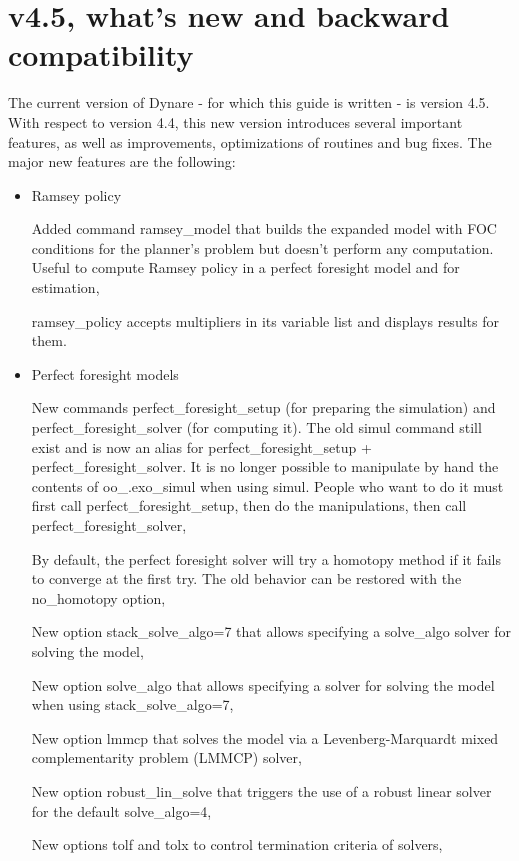 \documentclass[cn,10pt,math=newtx,citestyle=gb7714-2015,bibstyle=gb7714-2015]{elegantbook}
\begin{document}
	\section{v4.5, what's new and backward compatibility}
	The current version of Dynare - for which this guide is written - is version 4.5. With respect to version 4.4, this new version introduces several important features, as well as improvements, optimizations of routines and bug fixes. The major new features are the following:
	\begin{itemize}
		\item Ramsey policy
		
		
		Added command ramsey\_model that builds the expanded model with FOC conditions for the planner's problem but doesn't perform any computation. Useful to compute Ramsey policy in a perfect foresight model and for estimation,
		
		
		ramsey\_policy accepts multipliers in its variable list and displays results for them.
		
		\item Perfect foresight models
		
		
		New commands perfect\_foresight\_setup (for preparing the simulation) and perfect\_foresight\_solver (for computing it). The old simul command still exist and is now an alias for perfect\_foresight\_setup + perfect\_foresight\_solver. It is no longer possible to manipulate by hand the contents of
		oo\_.exo\_simul when using simul. People who want to do it must first call perfect\_foresight\_setup, then do the manipulations, then call perfect\_foresight\_solver,
		
		
		By default, the perfect foresight solver will try a homotopy method if it fails to converge at the first try. The old behavior can be restored with the no\_homotopy option,
		
		
		New option stack\_solve\_algo=7 that allows specifying a solve\_algo solver for solving the model,
		
		
		New option solve\_algo that allows specifying a solver for solving the model when using stack\_solve\_algo=7,
		
		
		New option lmmcp that solves the model via a Levenberg-Marquardt mixed complementarity problem (LMMCP) solver,
		
		
		New option robust\_lin\_solve that triggers the use of a robust linear solver for the default solve\_algo=4,
		
		
		New options tolf and tolx to control termination criteria of solvers,
		

\end{itemize}
\end{document}
